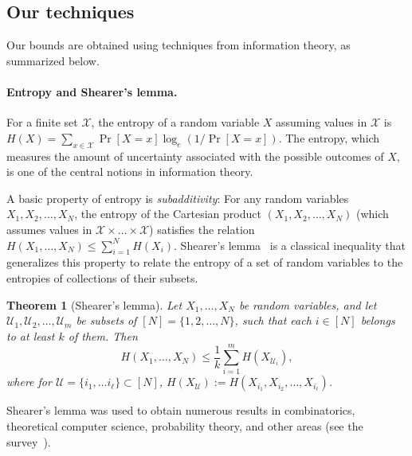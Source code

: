 \documentclass[11pt]{article}
\newtheorem{theorem}{Theorem}[section]
\newcommand{\Qcal}{\mathcal{U}}
\begin{document}
\subsection{Our techniques}
\label{sec:techniques}

Our bounds are obtained using techniques from information theory, as summarized below.

\paragraph{Entropy and Shearer's lemma.} 
For a finite set $\mathcal{X}$, the entropy of a random variable $X$ assuming values in $\mathcal{X}$ is $H(X)=\sum_{x \in \mathcal{X}} \Pr[X=x] \log_e (1/\Pr[X=x])$. 
The entropy, which measures the amount of uncertainty associated with the possible outcomes of $X$, is one of the central notions in information theory.

A basic property of entropy is \emph{subadditivity}: For any random variables $X_1,X_2,\ldots,X_N$, the entropy of the Cartesian product $(X_1,X_2,\ldots,X_N)$ (which assumes values in $\mathcal{X} \times \ldots \times \mathcal{X}$) satisfies the relation $H(X_1,\ldots,X_N)\leq \sum_{i=1}^N H(X_i)$. Shearer's lemma~\cite{ChungGFS86} is a classical inequality that generalizes this property to relate the entropy of a set of random variables to the entropies of collections of their subsets.
\begin{theorem}[Shearer's lemma]
Let $X_1,\ldots,X_N$ be random variables, and let $\Qcal_1,\Qcal_2,\ldots,\Qcal_m$ be subsets of $[N]=\{1,2,\ldots,N\}$, such that each $i \in [N]$ belongs to at least $k$ of them. Then
\[
H(X_1,\ldots,X_N) \leq \frac{1}{k} \sum_{i=1}^m H(X_{\Qcal_i}),
\]
where for $\Qcal =\{i_1,\dots i_\ell\} \subset [N]$, $H(X_{\Qcal}):=H(X_{i_1},X_{i_2},\ldots,X_{i_{\ell}})$.
\end{theorem}

Shearer's lemma was used to obtain numerous results in combinatorics, theoretical computer science, probability theory, and other areas
(see the survey~\cite{Galvin14}).
\end{document}
